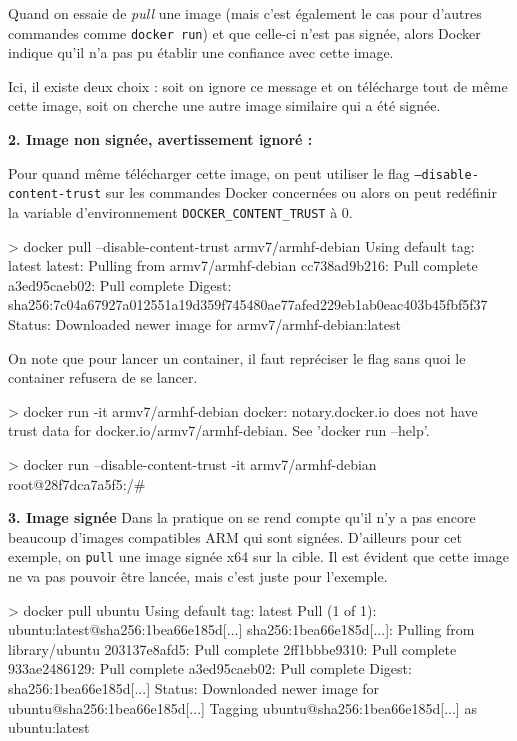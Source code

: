 \documentclass[11pt,a4paper,oneside]{report}
\newcommand{\code}[1]{\texttt{#1}}
\begin{document}
Quand on essaie de \textit{pull} une image (mais c'est également le cas pour d'autres commandes comme \code{docker run}) et que celle-ci n'est pas signée, alors Docker indique qu'il n'a pas pu établir une confiance avec cette image.

Ici, il existe deux choix : soit on ignore ce message et on télécharge tout de même cette image, soit on cherche une autre image similaire qui a été signée.

\textbf{2. Image non signée, avertissement ignoré :}

Pour quand même télécharger cette image, on peut utiliser le flag \code{--disable-content-trust} sur les commandes Docker concernées ou alors on peut redéfinir la variable d'environnement \code{DOCKER\_CONTENT\_TRUST} à 0.

\begin{textcode}
> docker pull --disable-content-trust armv7/armhf-debian
Using default tag: latest
latest: Pulling from armv7/armhf-debian
cc738ad9b216: Pull complete
a3ed95caeb02: Pull complete
Digest: sha256:7c04a67927a012551a19d359f745480ae77afed229eb1ab0eac403b45fbf5f37
Status: Downloaded newer image for armv7/armhf-debian:latest
\end{textcode}

On note que pour lancer un container, il faut repréciser le flag sans quoi le container refusera de se lancer.

\begin{textcode}
> docker run -it armv7/armhf-debian
docker: notary.docker.io does not have trust data for docker.io/armv7/armhf-debian.
See 'docker run --help'.
\end{textcode}

\begin{textcode}
> docker run --disable-content-trust -it armv7/armhf-debian
root@28f7dca7a5f5:/#
\end{textcode}

\textbf{3. Image signée}
Dans la pratique on se rend compte qu'il n'y a pas encore beaucoup d'images compatibles ARM qui sont signées. D'ailleurs pour cet exemple, on \code{pull} une image signée x64 sur la cible. Il est évident que cette image ne va pas pouvoir être lancée, mais c'est juste pour l'exemple.

\begin{textcode}
> docker pull ubuntu
Using default tag: latest
Pull (1 of 1): ubuntu:latest@sha256:1bea66e185d[...]
sha256:1bea66e185d[...]: Pulling from library/ubuntu
203137e8afd5: Pull complete
2ff1bbbe9310: Pull complete
933ae2486129: Pull complete
a3ed95caeb02: Pull complete
Digest: sha256:1bea66e185d[...]
Status: Downloaded newer image for ubuntu@sha256:1bea66e185d[...]
Tagging ubuntu@sha256:1bea66e185d[...] as ubuntu:latest
\end{textcode}
\end{document}
